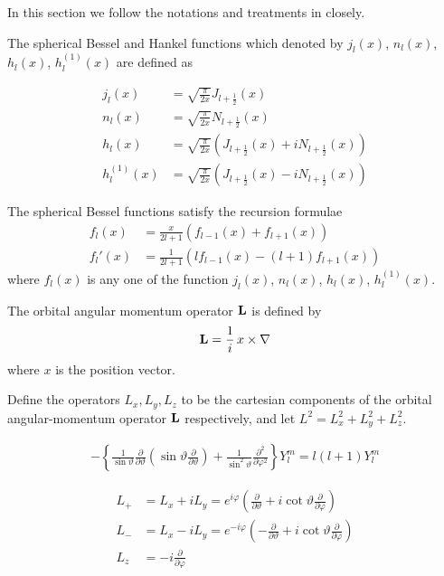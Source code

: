 In this section we follow the notations and treatments in \cite{jackson} closely.

The spherical Bessel and Hankel functions which denoted by $j_l(x)$, $n_l(x)$, $h_l(x)$, $h_l^{(1)}(x)$ are defined as

\begin{align}
  j_l(x) &= \sqrt{\frac{\pi}{2x}}J_{l+\frac{1}{2}}(x) \\
  n_l(x) &= \sqrt{\frac{\pi}{2x}}N_{l+\frac{1}{2}}(x) \\
  h_l(x) &= \sqrt{\frac{\pi}{2x}}\left(J_{l+\frac{1}{2}}(x) + iN_{l+\frac{1}{2}}(x)\right) \\
  h_l^{(1)}(x) &= \sqrt{\frac{\pi}{2x}}\left(J_{l+\frac{1}{2}}(x) - iN_{l+\frac{1}{2}}(x)\right)
\end{align}

The spherical Bessel functions satisfy the recursion formulae
\begin{align}
  f_l(x)  &= \frac{x}{2l+1}\left(f_{l-1}(x) + f_{l+1}(x)\right) \\
  f_l'(x) &= \frac{1}{2l+1}\left(lf_{l-1}(x) - (l+1)f_{l+1}(x)\right)
\end{align}
where $f_l(x)$ is any one of the function $j_l(x)$, $n_l(x)$, $h_l(x)$, $h_l^{(1)}(x)$.

The orbital angular momentum operator $\bf{L}$ is defined by
\begin{align}
  {\bf L} = \frac{1}{i}\,x\times\nabla
\end{align}
where $x$ is the position vector. 

Define the operators $L_x,L_y,L_z$ to be the cartesian components of the orbital angular-momentum operator $\bf{L}$ respectively, and let $L^2=L_x^2+L_y^2+L_z^2$. 

\begin{align}
  -\left\{\frac{1}{\sin\vartheta}\frac{\partial}{\partial\vartheta}\left(\sin\vartheta\frac{\partial}{\partial\vartheta}\right)+\frac{1}{\sin^2 \vartheta}\frac{\partial^2}{\partial\varphi^2}\right\} Y_l^m = l(l+1) Y_l^m
\end{align}

\begin{align}
  L_+ &= L_x+iL_y = e^{i\varphi}\left(\frac{\partial}{\partial\vartheta} + i\cot\vartheta\frac{\partial}{\partial\varphi}\right) \\
  L_- &= L_x-iL_y = e^{-i\varphi}\left(-\frac{\partial}{\partial\vartheta} + i\cot\vartheta\frac{\partial}{\partial\varphi}\right) \\
  L_z &= -i\frac{\partial}{\partial\varphi}
\end{align}
  
